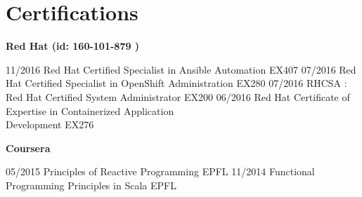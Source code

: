 \documentclass[]{friggeri-cv}
\begin{document}
\section{Certifications}        
    \textbf{ Red Hat (id: 160-101-879 ) \vspace{0.1cm}\\}        
	\begin{entrylist}
	
	\setlength{\parsepsave}{\parsep}%
	\setlength{\parsep}{-3pt}%
	
	\entryNoDetail
		{11/2016}
		{Red Hat Certified Specialist in Ansible Automation}
	    {EX407}
	    \entryNoDetail
	    {07/2016}
	    {Red Hat Certified Specialist in OpenShift Administration}
	    {EX280}
	    \entryNoDetail
	    {07/2016}
	    {RHCSA : Red Hat Certified System Administrator }
	    {EX200}   
	    \entryNoDetail
	    {06/2016}
	    {Red Hat Certificate of Expertise in Containerized Application \\ Development}
	    {EX276}
	\end{entrylist}    
	\textbf{Coursera \vspace{0.1cm}\\}    
	\begin{entrylist}
	\entryNoDetail
		{05/2015} 
		{Principles of Reactive Programming }
		{EPFL}
		\entryNoDetail
		{11/2014}
		{Functional Programming Principles in Scala}
		{EPFL}
	\end{entrylist}    
\end{document}
